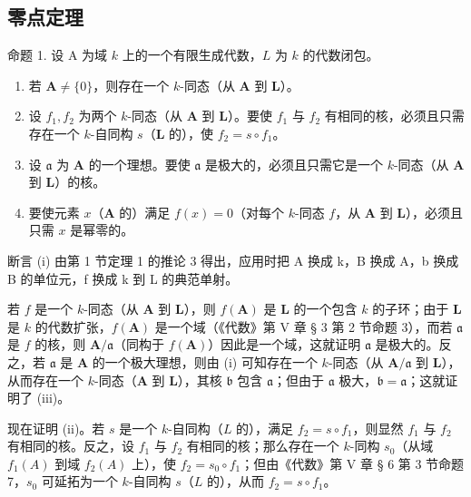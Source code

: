 \subsection{零点定理}

命题 1. 设 A 为域 \(k\) 上的一个有限生成代数，\(L\) 为 \(k\) 的代数闭包。

\begin{enumerate}
\def\labelenumi{(\roman{enumi})}
\item
  若 \(\mathbf{A} \neq \{0\}\)，则存在一个 \(k\)-同态（从 \(\mathbf{A}\) 到 \(\mathbf{L}\)）。
\item
  设 \(f_{1}, f_{2}\) 为两个 \(k\)-同态（从 \(\mathbf{A}\) 到 \(\mathbf{L}\)）。要使 \(f_{1}\) 与 \(f_{2}\) 有相同的核，必须且只需存在一个 \(k\)-自同构 \(s\)（\(\mathbf{L}\) 的），使 \(f_{2} = s \circ f_{1}\)。
\item
  设 \(\mathfrak{a}\) 为 \(\mathbf{A}\) 的一个理想。要使 \(\mathfrak{a}\) 是极大的，必须且只需它是一个 \(k\)-同态（从 \(\mathbf{A}\) 到 \(\mathbf{L}\)）的核。
\item
  要使元素 \(x\)（\(\mathbf{A}\) 的）满足 \(f(x) = 0\)（对每个 \(k\)-同态 \(f\)，从 \(\mathbf{A}\) 到 \(\mathbf{L}\)），必须且只需 \(x\) 是幂零的。
\end{enumerate}

断言 (i) 由第 1 节定理 1 的推论 3 得出，应用时把 A 换成 k，B 换成 A，b 换成 B 的单位元，f 换成 k 到 L 的典范单射。

若 \(f\) 是一个 \(k\)-同态（从 \(\mathbf{A}\) 到 \(\mathbf{L}\)），则 \(f(\mathbf{A})\) 是 \(\mathbf{L}\) 的一个包含 \(k\) 的子环；由于 \(\mathbf{L}\) 是 \(k\) 的代数扩张，\(f(\mathbf{A})\) 是一个域（《代数》第 V 章 § 3 第 2 节命题 3），而若 \(\mathfrak{a}\) 是 \(f\) 的核，则 \(\mathbf{A} / \mathfrak{a}\)（同构于 \(f(\mathbf{A})\)）因此是一个域，这就证明 \(\mathfrak{a}\) 是极大的。反之，若 \(\mathfrak{a}\) 是 \(\mathbf{A}\) 的一个极大理想，则由 (i) 可知存在一个 \(k\)-同态（从 \(\mathbf{A} / \mathfrak{a}\) 到 \(\mathbf{L}\)），从而存在一个 \(k\)-同态（\(\mathbf{A}\) 到 \(\mathbf{L}\)），其核 \(\mathfrak{b}\) 包含 \(\mathfrak{a}\)；但由于 \(\mathfrak{a}\) 极大，\(\mathfrak{b} = \mathfrak{a}\)；这就证明了 (iii)。

现在证明 (ii)。若 \(s\) 是一个 \(k\)-自同构（\(L\) 的），满足 \(f_2 = s \circ f_1\)，则显然 \(f_1\) 与 \(f_2\) 有相同的核。反之，设 \(f_1\) 与 \(f_2\) 有相同的核；那么存在一个 \(k\)-同构 \(s_0\)（从域 \(f_1(A)\) 到域 \(f_2(A)\) 上），使 \(f_2 = s_0 \circ f_1\)；但由《代数》第 V 章 § 6 第 3 节命题 7，\(s_0\) 可延拓为一个 \(k\)-自同构 \(s\)（\(L\) 的），从而 \(f_2 = s \circ f_1\)。

